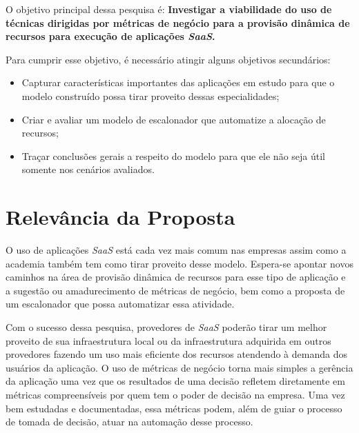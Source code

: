 \documentclass[a4paper,titlepage,12pt]{article}
\begin{document}
O objetivo principal dessa pesquisa é: \textbf{Investigar a viabilidade do uso de técnicas dirigidas por métricas de negócio para a provisão dinâmica de recursos para execução de aplicações \textit{SaaS}.}

Para cumprir esse objetivo, é necessário atingir alguns objetivos secundários:

\begin{itemize}
  \item Capturar características importantes das aplicações em estudo para que o modelo construído possa tirar proveito dessas especialidades;
  \item Criar e avaliar um modelo de escalonador que automatize a alocação de recursos;
  \item Traçar conclusões gerais a respeito do modelo para que ele não seja útil somente nos cenários avaliados. 
\end{itemize}

\section{Relevância da Proposta}
\label{sec:relev}

O uso de aplicações \textit{SaaS} está cada vez mais comum nas empresas assim como a academia também tem como tirar proveito desse modelo. Espera-se apontar novos caminhos na área de provisão dinâmica de recursos para esse tipo de aplicação e a sugestão ou amadurecimento de métricas de negócio, bem como a proposta de um escalonador que possa automatizar essa atividade.

Com o sucesso dessa pesquisa, provedores de \textit{SaaS} poderão tirar um melhor proveito de sua infraestrutura local ou da infraestrutura adquirida em outros provedores fazendo um uso mais eficiente dos recursos atendendo à demanda dos usuários da aplicação. O uso de métricas de negócio torna mais simples a gerência da aplicação uma vez que os resultados de uma decisão refletem diretamente em métricas compreensíveis por quem tem o poder de decisão na empresa. Uma vez bem estudadas e documentadas, essa métricas podem, além de guiar o processo de tomada de decisão, atuar na automação desse processo.
\end{document}
